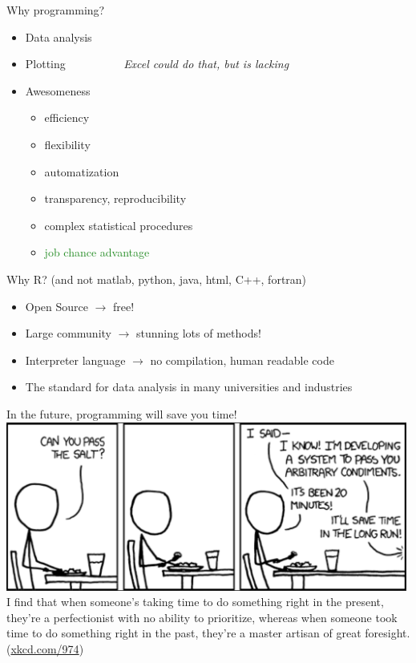 \documentclass[xcolor=table,       handout,    xcolor=dvipsnames]{beamer}\usepackage[]{graphicx}\usepackage[]{color}
\begin{document}
\begin{frame}{Why programming?}
\pause
\begin{itemize}[<+->]
  \item Data analysis
  \item Plotting
  \onslide<+->  \vspace{-0.5em} ~~~~~~~~~ \textit{Excel could do that, but is lacking} \vspace{0.5em}
  \item Awesomeness
    \begin{itemize}
    \item efficiency
    \item flexibility
    \item automatization
    \item transparency, reproducibility
    \item complex statistical procedures
    \item \textcolor{ForestGreen}{job chance advantage}
    \end{itemize}
\end{itemize}
\onslide<+-> Why R? (and not matlab, python, java, html, C++, fortran)
\begin{itemize}[<+->]
  \item Open Source $\rightarrow$ free!
  \item Large community $\rightarrow$ stunning lots of methods!
  \item Interpreter language $\rightarrow$ no compilation, human readable code
  \item The standard for data analysis in many universities and industries
\end{itemize}
\end{frame}


\begin{frame}{In the future, programming will save you time!}
\includegraphics[width=0.99\textwidth]{externalfig/xkcd3.PNG}\\
I find that when someone's taking time to do something right in the present, they're a perfectionist with no ability to prioritize, whereas when someone took time to do something right in the past, they're a master artisan of great foresight. (\href{https://xkcd.com/974/}{xkcd.com/974})\\
\end{frame}
\end{document}
